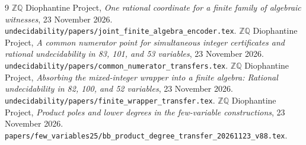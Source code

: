 \documentclass[11pt]{article}
\newcommand{\Q}{\mathbb Q}\newcommand{\Z}{\mathbb Z}
\begin{document}
\begin{thebibliography}{9}
\(\Z\Q\) Diophantine Project,
\emph{One rational coordinate for a finite family of algebraic witnesses},
23 November 2026.
\nolinkurl{undecidability/papers/joint_finite_algebra_encoder.tex}.
\(\Z\Q\) Diophantine Project,
\emph{A common numerator point for simultaneous integer certificates
and rational undecidability in 83, 101, and 53 variables},
23 November 2026.
\nolinkurl{undecidability/papers/common_numerator_transfers.tex}.
\(\Z\Q\) Diophantine Project,
\emph{Absorbing the mixed-integer wrapper into a finite algebra:
Rational undecidability in 82, 100, and 52 variables},
23 November 2026.
\nolinkurl{undecidability/papers/finite_wrapper_transfer.tex}.
\(\Z\Q\) Diophantine Project,
\emph{Product poles and lower degrees in the few-variable constructions},
23 November 2026.
\nolinkurl{papers/few_variables25/bb_product_degree_transfer_20261123_v88.tex}.
\end{thebibliography}
\end{document}
